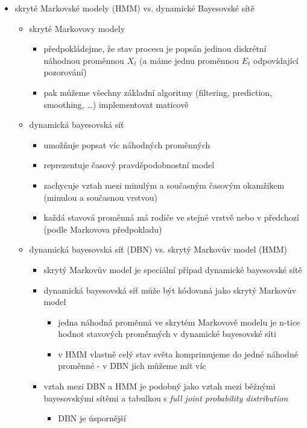 \begin{itemize}
\begin{itemize}
\begin{itemize}
\begin{itemize}
\item používá se \textit{Viterbiho} algoritmus
\end{itemize}
\end{itemize}
\end{itemize}
\item skryté Markovské modely (HMM) vs. dynamické Bayesovské sítě
\begin{itemize}
\item skryté Markovovy modely
\begin{itemize}
\item předpokládejme, že stav procesu je popsán jedinou diskrétní náhodnou proměnnou $X_t$ (a máme jednu proměnnou $E_t$ odpovídající pozorování)
\item pak můžeme všechny základní algoritmy (filtering, prediction, smoothing, \dots{}) implementovat maticově
\end{itemize}
\item dynamická bayesovská síť
\begin{itemize}
\item umožňuje popsat víc náhodných proměnných
\item reprezentuje časový pravděpodobnostní model
\item zachycuje vztah mezi minulým a současným časovým okamžikem (minulou a současnou vrstvou)
\item každá stavová proměnná má rodiče ve stejné vrstvě nebo v předchozí (podle Markovova předpokladu)
\end{itemize}
\item dynamická bayesovská síť (DBN) vs. skrytý Markovův model (HMM)
\begin{itemize}
\item skrytý Markovův model je speciální případ dynamické bayesovské sítě
\item dynamická bayesovská síť může být kódovaná jako skrytý Markovův model
\begin{itemize}
\item jedna náhodná proměnná ve skrytém Markovově modelu je n-tice hodnot stavových proměnných v dynamické bayesovské síti
\item v HMM vlastně celý stav světa komprimujeme do jedné náhodné proměnné - v DBN jich můžeme mít víc
\end{itemize}
\item vztah mezi DBN a HMM je podobný jako vztah mezi běžnými bayesovskými sítěmi a tabulkou s \textit{full joint probability distribution}
\begin{itemize}
\item DBN je úspornější
\end{itemize}
\end{itemize}
\end{itemize}
\end{itemize}
